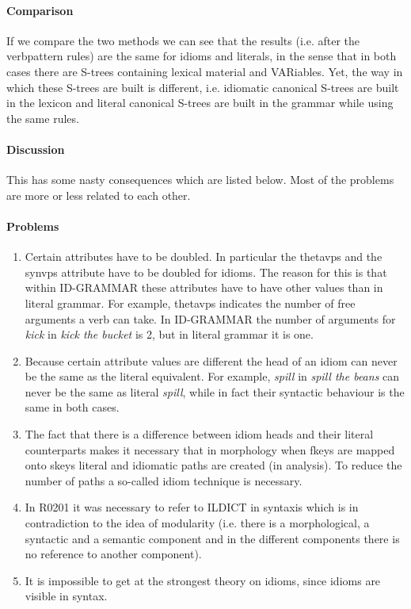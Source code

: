 \paragraph{Comparison}
If we compare the two methods we can see that the results (i.e. after the 
verbpattern rules) are the same for idioms and literals, in the sense that in
both cases there are S-trees containing lexical material and VARiables. Yet,
the way in which these S-trees are built is different, i.e. idiomatic canonical
S-trees are built in the lexicon and literal canonical S-trees are built in the 
grammar while using the same rules. 

\paragraph{Discussion}
This has some nasty consequences which are listed below. Most of the problems 
are more or less related to each other.

\paragraph{Problems}
\begin{enumerate}
  \item Certain attributes have to be doubled. In particular the thetavps and
the synvps attribute have to be doubled for idioms. The reason for this is that
within ID-GRAMMAR these attributes have to have other values than in literal
grammar. For example, thetavps indicates the number of free arguments a verb
can take. In ID-GRAMMAR the number of arguments for {\em kick} in {\em kick the
bucket} is 2, but in literal grammar it is one. 
  \item Because certain attribute values are different the head of an idiom can 
never be the same as the literal equivalent. For example, {\em spill} in {\em 
spill the beans} can never be the same as literal {\em spill}, while in fact 
their syntactic behaviour is the same in both cases.
  \item The fact that there is a difference between idiom heads and their
literal counterparts makes it necessary that in morphology when fkeys are 
mapped onto skeys literal and idiomatic paths are created (in analysis). To 
reduce the number of paths a so-called idiom technique is necessary.
  \item In R0201 it was necessary to refer to ILDICT in syntaxis which is in 
contradiction to the idea of modularity (i.e. there is a morphological, a 
syntactic and a semantic component and in the different components there is no 
reference to another component).
  \item It is impossible to get at the strongest theory on idioms, since idioms 
are visible in syntax.
\end{enumerate}

